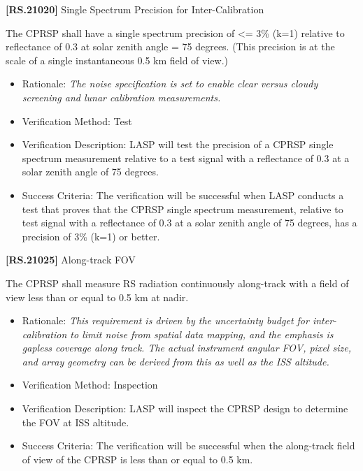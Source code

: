 \textbf{[RS.21020]} Single Spectrum Precision for Inter-Calibration

The \gls{CPRSP} shall have a single spectrum precision of <= 3\% (k=1) relative to reflectance of 0.3 at solar zenith angle = 75 degrees. (This precision is at the scale of a single instantaneous 0.5 km field of view.)

\begin{itemize}
\item{} Rationale: \emph{The noise specification is set to enable clear versus cloudy screening and lunar calibration measurements.}

\item{} Verification Method: Test

\item{} Verification Description: \gls{LASP} will \gls{test} the precision of a \gls{CPRSP} single spectrum \gls{measure}ment relative to a \gls{test} signal with a reflectance of 0.3 at a solar zenith angle of 75 degrees.

\item{} Success Criteria: The verification will be successful when \gls{LASP} conducts a \gls{test} that proves that the \gls{CPRSP} single spectrum \gls{measure}ment, relative to \gls{test} signal with a reflectance of 0.3 at a solar zenith angle of 75 degrees, has a precision of 3\% (k=1) or better.

\end{itemize}

\textbf{[RS.21025]} Along-track \gls{FOV}

The \gls{CPRSP} shall \gls{measure} \gls{RS} radiation continuously along-track with a field of view less than or equal to 0.5 km at nadir.

\begin{itemize}
\item{} Rationale: \emph{This requirement is driven by the uncertainty budget for inter-calibration to limit noise from spatial data mapping, and the emphasis is gapless coverage along track. The actual instrument angular FOV, pixel size, and array geometry can be derived from this as well as the ISS altitude.}

\item{} Verification Method: Inspection

\item{} Verification Description: \gls{LASP} will inspect the \gls{CPRSP} design to determine the \gls{FOV} at \gls{ISS} altitude.

\item{} Success Criteria: The verification will be successful when the along-track field of view of the \gls{CPRSP} is less than or equal to 0.5 km.

\end{itemize}

